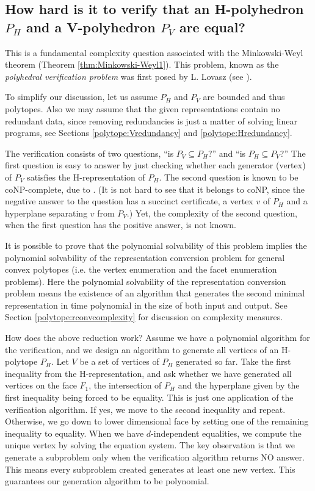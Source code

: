 \documentclass[a4paper,12pt]{article}
\begin{document}
\subsection{How hard is it to verify that an H-polyhedron $P_H$ and
a V-polyhedron $P_V$ are equal?}
\label{polytope:verification}

This is a fundamental complexity question associated with
the Minkowski-Weyl theorem (Theorem \ref{thm:Minkowski-Weyl1}).
This problem, known as the {\em polyhedral verification problem\/}
 was first posed by L. Lovasz (see \cite{s-nhg-94}).

To simplify our discussion, let us assume $P_H$ and $P_V$ are
bounded and thus polytopes.  Also we may assume that the given
representations contain no redundant data, since removing
redundancies is just a matter of solving linear programs, see
Sections \ref{polytope:Vredundancy} and \ref{polytope:Hredundancy}.

The verification consists of two questions,
``is $P_V \subseteq P_H$?'' and ``is $P_H \subseteq P_V$?''
The first question is easy to answer by just checking
whether each generator (vertex) of $P_V$ 
satisfies the H-representation of $P_H$.
The second question is known to be coNP-complete, due to \cite{fo-ocfpsc-85}.
(It is not hard to see that it belongs to coNP, since the negative answer
to the question
has a succinct certificate, a vertex $v$ of $P_H$ and a hyperplane
separating $v$ from $P_V$.)
Yet, the complexity of the second question, when the first question has
the positive answer, is not known. 

It is possible
to prove that the polynomial solvability of this problem implies 
the polynomial solvability of the representation conversion problem
for general convex polytopes
(i.e. the vertex enumeration and the facet enumeration problems).
Here the polynomial solvability of the representation conversion
problem means the existence of an algorithm that generates
the second minimal representation in time polynomial in
the size of both input and output.  See Section \ref{polytope:rconvcomplexity} for discussion on complexity measures.

How does the above reduction work? 
Assume we have a polynomial algorithm for the verification,
and we design an algorithm to generate all vertices of
an H-polytope $P_H$.  
Let $V$ be a set of vertices of $P_H$
generated so far.
Take the first inequality from the H-representation,
and ask whether we have generated all vertices on
the face $F_1$, the intersection of $P_H$ and
the hyperplane given by the first inequality being
forced to be equality.   This is just one application
of the verification algorithm.  If yes, we move to
the second inequality and repeat.  Otherwise, we go
down to lower dimensional face by setting one of
the remaining inequality to equality.  When we have
$d$-independent equalities, we compute the unique vertex
by solving the equation system.  The key observation
is that we generate a subproblem only when the verification
algorithm returns NO answer.   This means every subproblem
created generates at least one new vertex.  This guarantees
our generation algorithm to be polynomial.
\end{document}
